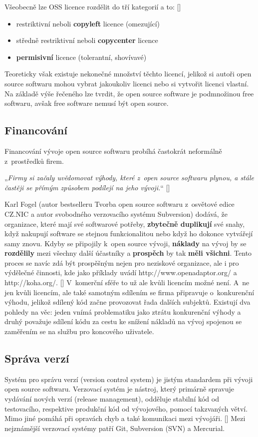 \documentclass[
	11pt, oneside, printed, final, palatino, monochrome
	microtype,
	table,   %
	lof,     %
	lot     %
]{fithesis3}
\makeatletter
\newcommand{\citepages}[2]{[\cite[#1]{#2}]}
\newcommand{\bold}[1]{\textbf{#1}}
\newcommand{\citace}[1]{„\textit{#1}“} %
\newcommand{\mezera}{\bigskip}
\makeatother
\begin{document}
{Všeobecně lze OSS licence rozdělit do tří kategorií a to: \citepages{9-10}{6226510}
\begin{itemize}
\item restriktivní neboli \bold{copyleft} licence (omezující)
\item středně restriktivní neboli \bold{copycenter} licence
\item \bold{permisivní} licence (tolerantní, shovívavé)
\end{itemize}
Teoreticky však existuje nekonečné množství těchto licencí, jelikož si autoři open source softwaru mohou vybrat jakoukoliv licenci nebo si vytvořit licenci vlastní.
Na základě výše řečeného lze tvrdit, že open source software je podmnožinou free softwaru, avšak free software nemusí být open source.

\subsection{Financování}
Financování vývoje open source softwaru probíhá častokrát neformálně z~prostředků firem.

\mezera 
\citace{Firmy si začaly uvědomovat výhody, které z~open source softwaru plynou, a stále častěji se přímým způsobem podílejí na jeho vývoji.} \citepages{129}{Fogel2012}
\mezera

Karl Fogel (autor bestselleru Tvorba open source softwaru z~osvětové edice CZ.NIC a autor svobodného verzovacího systému Subversion) dodává, že organizace, které mají své softwarové potřeby, \bold{zbytečně duplikují} své snahy, když nakupují software se stejnou funkcionalitou nebo když ho dokonce vytvářejí samy znovu. Kdyby se připojily k~open source vývoji, \bold{náklady} na vývoj by se \bold{rozdělily} mezi všechny další účastníky a \bold{prospěch} by tak \bold{měli všichni}. Tento proces se navíc zdá být prospěšným nejen pro neziskové organizace, ale i pro výdělečné činnosti, kde jako příklady uvádí http://www.openadaptor.org/ a http://koha.org/. \citepages{130-132}{Fogel2012} V~komerční sféře to už ale kvůli licencím možné není. A~ne jen kvůli licencím, ale také samotným sdílením se firma připravuje o~konkurenční výhodu, jelikož sdílený kód začne provozovat řada dalších subjektů. Existují dva pohledy na věc: jeden vnímá problematiku jako ztrátu konkurenční výhody a druhý považuje sdílení kódu za cestu ke snížení nákladů na vývoj spojenou se zaměřením se na službu pro koncového uživatele.


\subsection{Správa verzí}
Systém pro správu verzí (version control system) je jistým standardem při vývoji open source softwaru. Verzovací systém je nástroj, který primárně spravuje vydávání nových verzí (release management), odděluje stabilní kód od testovacího, respektive produkční kód od vývojového, pomocí takzvaných větví. Mimo jiné pomáhá při opravách chyb a také komunikaci mezi vývojáři. \citepages{17-21, 59-64}{Chaconc2009} Mezi nejznámější verzovací systémy patří Git, Subversion (SVN) a Mercurial.

}
\end{document}
